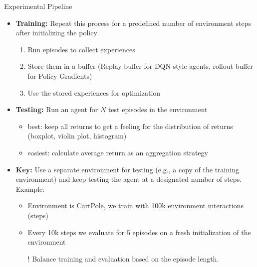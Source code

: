 \documentclass[aspectratio=169]{../latex_main/tntbeamer}  %
\begin{document}
\begin{frame}[c]{Experimental Pipeline}

\begin{itemize}
    \item \textbf{Training:} Repeat this process for a predefined number of environment steps after initializing the policy
        \begin{enumerate}
            \item Run episodes to collect experiences
            \item Store them in a buffer (Replay buffer for DQN style agents, rollout buffer for Policy Gradients)
            \item Use the stored experiences for optimization
        \end{enumerate}
    \vfill 
    \item \textbf{Testing:} Run an agent for $N$ test episodes in the environment
        \begin{itemize}
            \item best: keep all returns to get a feeling for the distribution of returns (boxplot, violin plot, histogram)
            \item easiest: calculate average return as an aggregation strategy
        \end{itemize}

    \vfill
    \item \textbf{Key:} Use a separate environment for testing (e.g., a copy of the training environment) and keep testing the agent at a designated number of steps. Example:
    \begin{itemize}
        \item Environment is CartPole, we train with 100k environment interactions (steps)
        \item Every 10k steps we evaluate for 5 episodes on a fresh initialization of the environment
        \item[!] Balance training and evaluation based on the episode length. 
    \end{itemize}
\end{itemize}


        
\end{frame}


\end{document}

